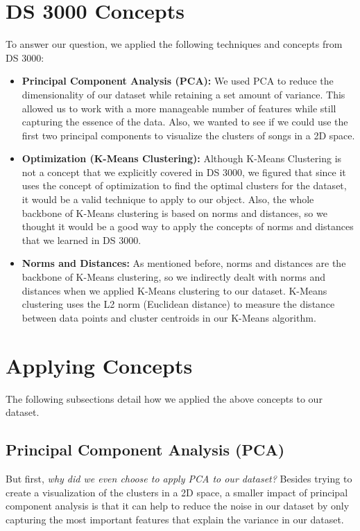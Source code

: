 \documentclass[11pt]{article}
\begin{document}
\section{DS 3000 Concepts}

To answer our question, we applied the following techniques and concepts from DS 3000:

\begin{itemize}
    \item \textbf{Principal Component Analysis (PCA):} We used PCA to reduce the dimensionality of our dataset while retaining a set amount of variance. This allowed us to work with a more manageable number of features while still capturing the essence of the data. Also, we wanted to see if we could use the first two principal components to visualize the clusters of songs in a 2D space.
    \item \textbf{Optimization (K-Means Clustering):} Although K-Means Clustering is not a concept that we explicitly covered in DS 3000, we figured that since it uses the concept of optimization to find the optimal clusters for the dataset, it would be a valid technique to apply to our object. Also, the whole backbone of K-Means clustering is based on norms and distances, so we thought it would be a good way to apply the concepts of norms and distances that we learned in DS 3000.
    \item \textbf{Norms and Distances:} As mentioned before, norms and distances are the backbone of K-Means clustering, so we indirectly dealt with norms and distances when we applied K-Means clustering to our dataset. K-Means clustering uses the L2 norm (Euclidean distance) to measure the distance between data points and cluster centroids in our K-Means algorithm.
\end{itemize}

\section{Applying Concepts}

The following subsections detail how we applied the above concepts to our dataset.

\subsection{Principal Component Analysis (PCA)}

But first, \textit{why did we even choose to apply PCA to our dataset?} Besides trying to create a visualization of the clusters in a 2D space, a smaller impact of principal component analysis is that it can help to reduce the noise in our dataset by only capturing the most important features that explain the variance in our dataset.
\end{document}
